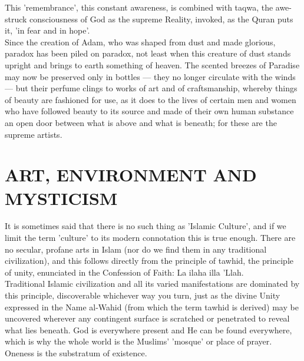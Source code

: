 \documentclass[10pt, twoside,openright]{book}
\begin{document}
This 'remembrance', this constant awareness, is combined with taqwa, the awe\hyp{}struck consciousness of 
God as the supreme Reality, invoked, as the Quran puts it, 'in fear and in hope'. \\

Since the creation of Adam, who was shaped from dust and made glorious, paradox has been piled on 
paradox, not least when this creature of dust stands upright and brings to earth something of heaven. 
The scented breezes of Paradise may now be preserved only in bottles --- they no longer circulate with 
the winds --- but their perfume clings to works of art and of craftsmanship, whereby things of beauty 
are fashioned for use, as it does to the lives of certain men and women who have followed beauty to 
its source and made of their own human substance an open door between what is above and what is 
beneath; for these are the supreme artists. \\


\chapter{ART, ENVIRONMENT AND MYSTICISM}

It is sometimes said that there is no such thing as 'Islamic Culture', and if we limit the term 
'culture' to its modern connotation this is true enough. There are no secular, profane arts in Islam 
(nor do we find them in any traditional civilization), and this follows directly from the principle 
of tawhid, the principle of unity, enunciated in the Confession of Faith: La ilaha illa 'Llah. \\

Traditional Islamic civilization and all its varied manifestations are dominated by this principle, 
discoverable whichever way you turn, just as the divine Unity expressed in the Name al\hyp{}Wahid (from 
which the term tawhid is derived) may be uncovered wherever any contingent surface is scratched or 
penetrated to reveal what lies beneath. God is everywhere present and He can be found everywhere, 
which is why the whole world is the Muslims' 'mosque' or place of prayer. Oneness is the substratum 
of existence. \\
\end{document}
